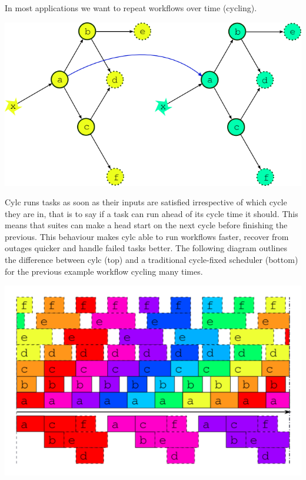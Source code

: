 In most applications we want to repeat workflows over time (cycling).

\begin{center}
    \includegraphics[width=0.5\columnwidth]{resources/tex/dep-two-cycles-linked}
\end{center}

Cylc runs tasks as soon as their inputs are satisfied irrespective of which
cycle they are in, that is to say if a task can run ahead of its cycle time it
should. This means that suites can make a head start on the next cycle before
finishing the previous. This behaviour makes cylc able to run workflows
faster, recover from outages quicker and handle failed tasks better. The
following diagram outlines the difference between cylc (top) and a traditional
cycle-fixed scheduler (bottom) for the previous example workflow cycling
many times.

\begin{center}
    \includegraphics[width=0.6\columnwidth]{resources/tex/timeline-two}
\end{center}
